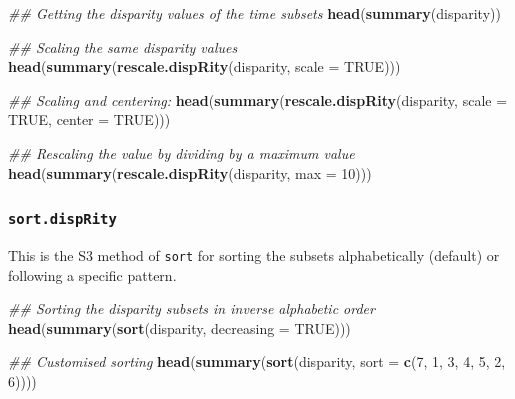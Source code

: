 \documentclass[
]{book}
\newenvironment{Shaded}{\begin{snugshade}}{\end{snugshade}}
\newcommand{\CommentTok}[1]{\textcolor[rgb]{0.56,0.35,0.01}{\textit{#1}}}
\newcommand{\DataTypeTok}[1]{\textcolor[rgb]{0.13,0.29,0.53}{#1}}
\newcommand{\DecValTok}[1]{\textcolor[rgb]{0.00,0.00,0.81}{#1}}
\newcommand{\KeywordTok}[1]{\textcolor[rgb]{0.13,0.29,0.53}{\textbf{#1}}}
\newcommand{\NormalTok}[1]{#1}
\newcommand{\OtherTok}[1]{\textcolor[rgb]{0.56,0.35,0.01}{#1}}
\begin{document}
\begin{Shaded}
\begin{Highlighting}[]
\CommentTok{\#\# Getting the disparity values of the time subsets}
\KeywordTok{head}\NormalTok{(}\KeywordTok{summary}\NormalTok{(disparity))}

\CommentTok{\#\# Scaling the same disparity values}
\KeywordTok{head}\NormalTok{(}\KeywordTok{summary}\NormalTok{(}\KeywordTok{rescale.dispRity}\NormalTok{(disparity, }\DataTypeTok{scale =} \OtherTok{TRUE}\NormalTok{)))}

\CommentTok{\#\# Scaling and centering:}
\KeywordTok{head}\NormalTok{(}\KeywordTok{summary}\NormalTok{(}\KeywordTok{rescale.dispRity}\NormalTok{(disparity, }\DataTypeTok{scale =} \OtherTok{TRUE}\NormalTok{, }\DataTypeTok{center =} \OtherTok{TRUE}\NormalTok{)))}

\CommentTok{\#\# Rescaling the value by dividing by a maximum value}
\KeywordTok{head}\NormalTok{(}\KeywordTok{summary}\NormalTok{(}\KeywordTok{rescale.dispRity}\NormalTok{(disparity, }\DataTypeTok{max =} \DecValTok{10}\NormalTok{)))}
\end{Highlighting}
\end{Shaded}

\hypertarget{sort.disprity}{%
\subsubsection{\texorpdfstring{\texttt{sort.dispRity}}{sort.dispRity}}\label{sort.disprity}}

This is the S3 method of \texttt{sort} for sorting the subsets alphabetically (default) or following a specific pattern.

\begin{Shaded}
\begin{Highlighting}[]
\CommentTok{\#\# Sorting the disparity subsets in inverse alphabetic order}
\KeywordTok{head}\NormalTok{(}\KeywordTok{summary}\NormalTok{(}\KeywordTok{sort}\NormalTok{(disparity, }\DataTypeTok{decreasing =} \OtherTok{TRUE}\NormalTok{)))}

\CommentTok{\#\# Customised sorting}
\KeywordTok{head}\NormalTok{(}\KeywordTok{summary}\NormalTok{(}\KeywordTok{sort}\NormalTok{(disparity, }\DataTypeTok{sort =} \KeywordTok{c}\NormalTok{(}\DecValTok{7}\NormalTok{, }\DecValTok{1}\NormalTok{, }\DecValTok{3}\NormalTok{, }\DecValTok{4}\NormalTok{, }\DecValTok{5}\NormalTok{, }\DecValTok{2}\NormalTok{, }\DecValTok{6}\NormalTok{))))}
\end{Highlighting}
\end{Shaded}
\end{document}

